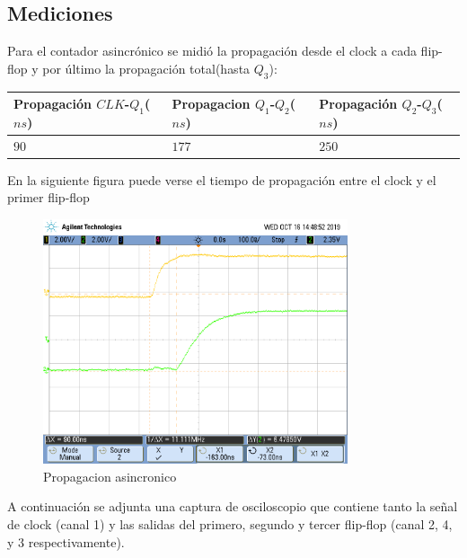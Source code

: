 \subsection{Mediciones}

Para el contador asincrónico se midió la propagación desde el clock a cada flip-flop y por último la propagación total(hasta $Q_3$):

\begin{table}[H]
\centering
\begin{tabular}{lll}\hline
Propagación $CLK$-$Q_1$($ns$) & Propagacion $Q_1$-$Q_2$($ns$) & Propagación $Q_2$-$Q_3$($ns$)\\ \hline
$90$  &       $177$ & $250$  \\ \hline

\end{tabular}
\end{table}

En la siguiente figura puede verse el tiempo de propagación entre el clock y el primer flip-flop

\begin{figure}[H]
	\centering
	\includegraphics[width=0.8\textwidth]{Ejercicio7/Recursos/propagacion_asincronico.png}
	\caption{Propagacion asincronico}
\end{figure}

A continuación se adjunta una captura de osciloscopio que contiene tanto la señal de clock (canal 1) y las salidas del primero, segundo y tercer flip-flop (canal 2, 4, y 3 respectivamente). 

